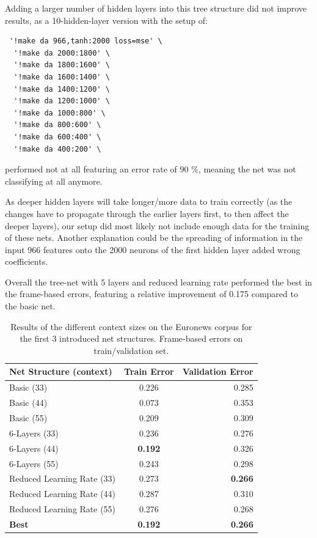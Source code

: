 Adding a larger number of hidden layers into this tree structure did not improve results, as a 10-hidden-layer version with the setup of:

\begin{verbatim}
 '!make da 966,tanh:2000 loss=mse' \
  '!make da 2000:1800' \
  '!make da 1800:1600' \
  '!make da 1600:1400' \
  '!make da 1400:1200' \
  '!make da 1200:1000' \
  '!make da 1000:800' \
  '!make da 800:600' \
  '!make da 600:400' \
  '!make da 400:200' \
\end{verbatim}

performed not at all featuring an error rate of 90 \%, meaning the net was not classifying at all anymore.  

As deeper hidden layers will take longer/more data to train correctly (as the changes have to propagate through the earlier layers first, to then affect the deeper layers), our setup did most likely not include enough data for the training of these nets. Another explanation could be the spreading of information in the input 966 features onto the 2000 neurons of the first hidden layer added wrong coefficients.

Overall the tree-net with 5 layers and reduced learning rate performed the best in the frame-based errors, featuring a relative improvement of 0.175 compared to the basic net.

\begin{table}[h!]
\caption{Results of the different context sizes on the Euronews corpus for the first 3 introduced net structures. Frame-based errors on train/validation set.}
\label{tab:resCtx}
\centering
\begin{tabular}{| l | c | r | }
	\hline
	\textbf{Net Structure (context)} & \textbf{Train Error} & \textbf{Validation Error}  \\
	\hline
	Basic (33) & 0.226 &  0.285 \\
	\hline
	Basic (44) & 0.073 & 0.353 \\
	\hline
	Basic (55) & 0.209 & 0.309 \\
	\hline
	6-Layers (33) & 0.236 & 0.276 \\
	\hline
	6-Layers (44) & \textbf{0.192} & 0.326 \\
	\hline
	6-Layers (55) & 0.243 & 0.298 \\
	\hline
	Reduced Learning Rate (33) & 0.273 & \textbf{0.266} \\ 
	\hline
	Reduced Learning Rate (44) & 0.287 & 0.310 \\ 
	\hline
	Reduced Learning Rate (55) & 0.276 & 0.268 \\ 
	\hline
	\textbf{Best} & \textbf{0.192} & \textbf{0.266} \\
	\hline
\end{tabular}
\end{table}


